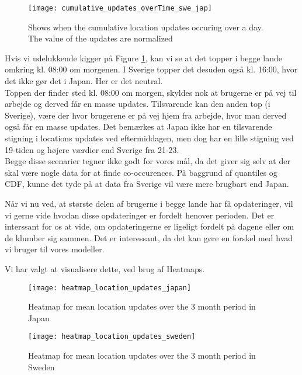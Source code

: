 \begin{figure}[H]
    \hspace*{-1.8cm}
    \centering
    \texttt{[image: cumulative\_updates\_overTime\_swe\_jap]}
    \caption{Shows when the cumulative location updates occuring over a day. The value of the updates are normalized}
    \label{fig:cumu_loc_time_jap_swe}
\end{figure}

Hvis vi udelukkende kigger på Figure \ref{fig:cumu_loc_time_jap_swe}, kan vi se at det topper i begge lande omkring kl. 08:00 om morgenen. I Sverige topper det desuden også kl. 16:00, hvor det ikke gør det i Japan. Her er det neutral. \\
Toppen der finder sted kl. 08:00 om morgen, skyldes nok at brugerne er på vej til arbejde og derved får en masse updates. Tilsvarende kan den anden top (i Sverige), være der hvor brugerene er på vej hjem fra arbejde, hvor man derved også får en masse updates. Det bemærkes at Japan ikke har en tilsvarende stigning i locations updates ved eftermiddagen, men dog har en lille stigning ved 19-tiden og højere værdier end Sverige fra 21-23.\\

Begge disse scenarier tegner ikke godt for vores mål, da det giver sig selv at der skal være nogle data for at finde co-occurences. 
På baggrund af quantiles og CDF, kunne det tyde på at data fra Sverige vil være mere brugbart end Japan. 

Når vi nu ved, at største delen af brugerne i begge lande har få opdateringer, vil vi gerne vide hvodan disse opdateringer er fordelt henover perioden. Det er interssant for os at vide, om opdateringerne er ligeligt fordelt på dagene eller om de klumber sig sammen. Det er interessant, da det kan gøre en forskel med hvad vi bruger til vores modeller. 

Vi har valgt at visualisere dette, ved brug af Heatmaps. 

\newpage


\begin{figure}[H]
    \hspace*{-1.5cm}
    \centering
    \texttt{[image: heatmap\_location\_updates\_japan]}
    \caption{Heatmap for mean location updates over the 3 month period in Japan}
    \label{fig:heatmap_jap}
\end{figure}
\begin{figure}[H]
    \hspace*{-1.5cm}
    \centering
    \texttt{[image: heatmap\_location\_updates\_sweden]}
    \caption{Heatmap for mean location updates over the 3 month period in Sweden}
    \label{fig:heatmap_swe}
\end{figure}



